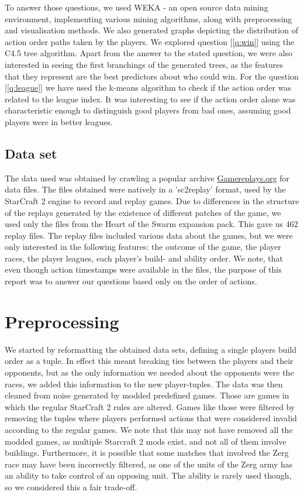 \documentclass[a4paper,11pt]{article}
\begin{document}
To answer those questions, we used WEKA - an open source data mining environment, implementing various mining algorithms, along with preprocessing and visualisation methods. We also generated graphs depicting the distribution of action order paths taken by the players.
We explored question [\ref{q:win}] using the C4.5 tree algorithm. Apart from the answer to the stated question, we were also interested in seeing the first branchings of the generated trees, as the features that they represent are the best predictors about who could win. 
For the question [\ref{q:league}] we have used the k-means algorithm to check if the action order was related to the league index. It was interesting to see if the action order alone was characteristic enough to distinguish good players from bad ones, assuming good players were in better leagues.

\subsection{Data set}
The data used was obtained by crawling a popular archive \url{Gamereplays.org} for data files.
The files obtained were natively in a 'sc2replay' format, used by the StarCraft 2 engine to record and replay games. Due to differences in the structure of the replays generated by the existence of different patches of the game, we used only the files from the Heart of the Swarm expansion pack. This gave us 462 replay files. The replay files included various data about the games, but we were only interested in the following features: the outcome of the game, the player races, the player leagues, each player’s build- and ability order.
We note, that even though action timestamps were available in the files, the purpose of this report was to answer our questions based only on the order of actions.

\section{Preprocessing}
\label{sec:preprocessing}
We started by reformatting the obtained data sets, defining a single players build order as a tuple.
In effect this meant breaking ties between the players and their opponents, but as the only information we needed about the opponents were the races, we added this information to the new player-tuples.
The data was then cleaned from noise generated by modded predefined games. Those are games in which the regular StarCraft 2 rules are altered. Games like those were filtered by removing the tuples where players performed actions that were considered invalid according to the regular games. We note that this may not have removed all the modded games, as multiple Starcraft 2 mods exist, and not all of them involve buildings. Furthermore, it is possible that some matches that involved the Zerg race may have been incorrectly filtered, as one of the units of the Zerg army has an ability to take control of an opposing unit. The ability is rarely used though, so we considered this a fair trade-off.
\end{document}
